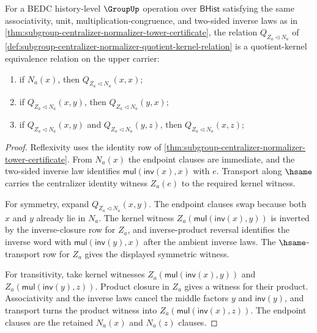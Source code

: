 \begin{theorem}
\label{thm:subgroup-centralizer-normalizer-quotient-kernel-congruence}
For a BEDC history-level $\GroupUp$ operation over $\mathsf{BHist}$ satisfying
the same associativity, unit, multiplication-congruence, and two-sided inverse
laws as in
\autoref{thm:subgroup-centralizer-normalizer-tower-certificate}, the relation
$Q_{Z_a\triangleleft N_a}$ of
\autoref{def:subgroup-centralizer-normalizer-quotient-kernel-relation} is a
quotient-kernel equivalence relation on the upper carrier:
\begin{enumerate}
\item if $N_a(x)$, then $Q_{Z_a\triangleleft N_a}(x,x)$;
\item if $Q_{Z_a\triangleleft N_a}(x,y)$, then
$Q_{Z_a\triangleleft N_a}(y,x)$;
\item if $Q_{Z_a\triangleleft N_a}(x,y)$ and
$Q_{Z_a\triangleleft N_a}(y,z)$, then
$Q_{Z_a\triangleleft N_a}(x,z)$;
\end{enumerate}
\end{theorem}
\begin{proof}
Reflexivity uses the identity row of
\autoref{thm:subgroup-centralizer-normalizer-tower-certificate}. From
$N_a(x)$ the endpoint clauses are immediate, and the two-sided inverse law
identifies $\mathsf{mul}(\mathsf{inv}(x),x)$ with $e$. Transport along
$\hsame$ carries the centralizer identity witness $Z_a(e)$ to the required
kernel witness.

For symmetry, expand $Q_{Z_a\triangleleft N_a}(x,y)$. The endpoint clauses
swap because both $x$ and $y$ already lie in $N_a$. The kernel witness
$Z_a(\mathsf{mul}(\mathsf{inv}(x),y))$ is inverted by the inverse-closure row
for $Z_a$, and inverse-product reversal identifies the inverse word with
$\mathsf{mul}(\mathsf{inv}(y),x)$ after the ambient inverse laws. The
$\hsame$-transport row for $Z_a$ gives the displayed symmetric witness.

For transitivity, take kernel witnesses
$Z_a(\mathsf{mul}(\mathsf{inv}(x),y))$ and
$Z_a(\mathsf{mul}(\mathsf{inv}(y),z))$. Product closure in $Z_a$ gives a
witness for their product. Associativity and the inverse laws cancel the
middle factors $y$ and $\mathsf{inv}(y)$, and transport turns the product
witness into $Z_a(\mathsf{mul}(\mathsf{inv}(x),z))$. The endpoint clauses are
the retained $N_a(x)$ and $N_a(z)$ clauses.
\end{proof}

